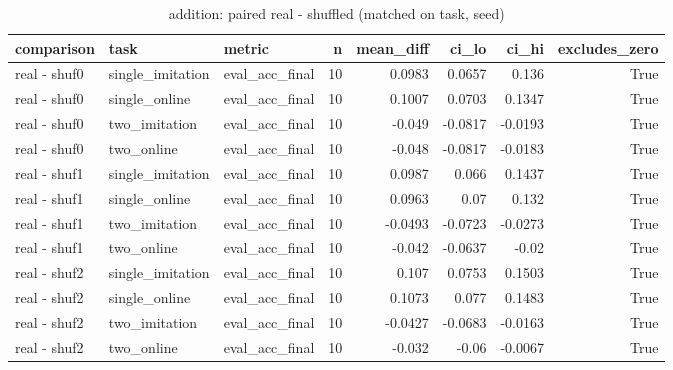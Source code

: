 \begin{table}[t]
\centering
\small
\begin{tabular}{lllrrrrr}
\toprule
comparison & task & metric & n & mean\_diff & ci\_lo & ci\_hi & excludes\_zero \\
\midrule
real - shuf0 & single\_imitation & eval\_acc\_final & 10 & 0.0983 & 0.0657 & 0.136 & True \\
real - shuf0 & single\_online & eval\_acc\_final & 10 & 0.1007 & 0.0703 & 0.1347 & True \\
real - shuf0 & two\_imitation & eval\_acc\_final & 10 & -0.049 & -0.0817 & -0.0193 & True \\
real - shuf0 & two\_online & eval\_acc\_final & 10 & -0.048 & -0.0817 & -0.0183 & True \\
real - shuf1 & single\_imitation & eval\_acc\_final & 10 & 0.0987 & 0.066 & 0.1437 & True \\
real - shuf1 & single\_online & eval\_acc\_final & 10 & 0.0963 & 0.07 & 0.132 & True \\
real - shuf1 & two\_imitation & eval\_acc\_final & 10 & -0.0493 & -0.0723 & -0.0273 & True \\
real - shuf1 & two\_online & eval\_acc\_final & 10 & -0.042 & -0.0637 & -0.02 & True \\
real - shuf2 & single\_imitation & eval\_acc\_final & 10 & 0.107 & 0.0753 & 0.1503 & True \\
real - shuf2 & single\_online & eval\_acc\_final & 10 & 0.1073 & 0.077 & 0.1483 & True \\
real - shuf2 & two\_imitation & eval\_acc\_final & 10 & -0.0427 & -0.0683 & -0.0163 & True \\
real - shuf2 & two\_online & eval\_acc\_final & 10 & -0.032 & -0.06 & -0.0067 & True \\
\bottomrule
\end{tabular}
\caption{addition: paired real - shuffled (matched on task, seed)}
\label{tab:wiring_addition_paired}
\end{table}